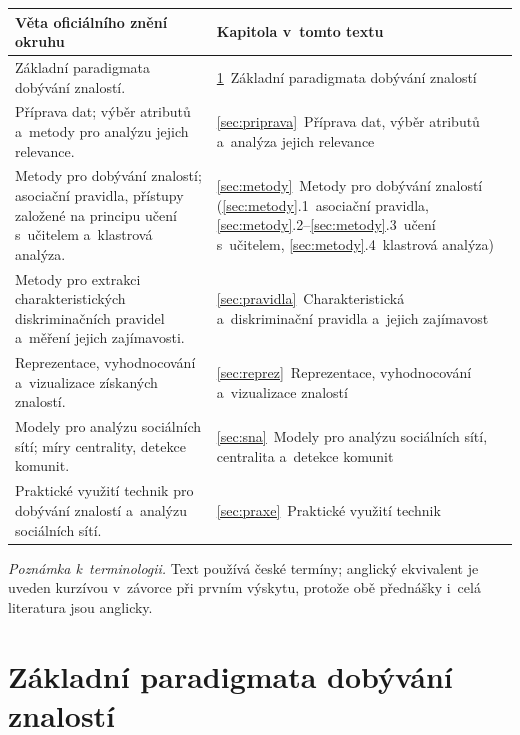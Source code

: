 \documentclass[11pt,a4paper]{article}
\theoremstyle{definition}
\begin{document}
\begin{center}
\small
\begin{tabular}{@{}>{\raggedright\arraybackslash}p{8.6cm}>{\raggedright\arraybackslash}p{7.4cm}@{}}
\toprule
\textbf{Věta oficiálního znění okruhu} & \textbf{Kapitola v~tomto textu} \\
\midrule
Základní paradigmata dobývání znalostí.
  & \ref{sec:paradigmata}~Základní paradigmata dobývání znalostí \\
Příprava dat; výběr atributů a~metody pro analýzu jejich relevance.
  & \ref{sec:priprava}~Příprava dat, výběr atributů a~analýza jejich relevance \\
Metody pro dobývání znalostí; asociační pravidla, přístupy založené na principu učení
s~učitelem a~klastrová analýza.
  & \ref{sec:metody}~Metody pro dobývání znalostí (\ref{sec:metody}.1~asociační pravidla,
    \ref{sec:metody}.2--\ref{sec:metody}.3~učení s~učitelem, \ref{sec:metody}.4~klastrová
    analýza) \\
Metody pro extrakci charakteristických diskriminačních pravidel a~měření jejich
zajímavosti.
  & \ref{sec:pravidla}~Charakteristická a~diskriminační pravidla a~jejich zajímavost \\
Reprezentace, vyhodnocování a~vizualizace získaných znalostí.
  & \ref{sec:reprez}~Reprezentace, vyhodnocování a~vizualizace znalostí \\
Modely pro analýzu sociálních sítí; míry centrality, detekce komunit.
  & \ref{sec:sna}~Modely pro analýzu sociálních sítí, centralita a~detekce komunit \\
Praktické využití technik pro dobývání znalostí a~analýzu sociálních sítí.
  & \ref{sec:praxe}~Praktické využití technik \\
\bottomrule
\end{tabular}
\end{center}

\vspace{1mm}
\noindent\small\textit{Poznámka k~terminologii.} Text používá české termíny; anglický
ekvivalent je uveden kurzívou v~závorce při prvním výskytu, protože obě přednášky i~celá
literatura jsou anglicky.\normalsize

\vspace{2mm}
\tableofcontents
\newpage

\section{Základní paradigmata dobývání znalostí}
\label{sec:paradigmata}
\end{document}
